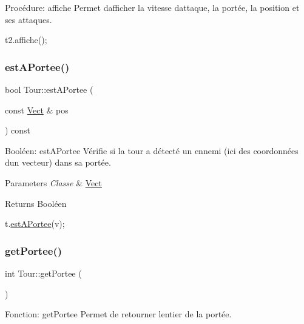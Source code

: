 Procédure\+: affiche Permet d\textquotesingle{}afficher la vitesse d\textquotesingle{}attaque, la portée, la position et ses attaques. 


\begin{DoxyCode}
t2.affiche();
\end{DoxyCode}
 \mbox{\label{classTour_ad9f4d42370374f373f48f7d0fb36559a}} 
\subsubsection{\texorpdfstring{est\+A\+Portee()}{estAPortee()}}
{\footnotesize\ttfamily bool Tour\+::est\+A\+Portee (\begin{DoxyParamCaption}\item[{const \hyperlink{classVect}{Vect} \&}]{pos }\end{DoxyParamCaption}) const}



Booléen\+: est\+A\+Portee Vérifie si la tour a détecté un ennemi (ici des coordonnées d\textquotesingle{}un vecteur) dans sa portée. 


\begin{DoxyParams}{Parameters}
{\em Classe} & \hyperlink{classVect}{Vect} \\
\hline
\end{DoxyParams}
\begin{DoxyReturn}{Returns}
Booléen 
\begin{DoxyCode}
t.\hyperlink{classTour_ad9f4d42370374f373f48f7d0fb36559a}{estAPortee}(v);
\end{DoxyCode}
 
\end{DoxyReturn}
\mbox{\label{classTour_a4c0b40ef85678f12cc7a3e78588094e8}} 
\subsubsection{\texorpdfstring{get\+Portee()}{getPortee()}}
{\footnotesize\ttfamily int Tour\+::get\+Portee (\begin{DoxyParamCaption}{ }\end{DoxyParamCaption})}



Fonction\+: get\+Portee Permet de retourner l\textquotesingle{}entier de la portée. 

